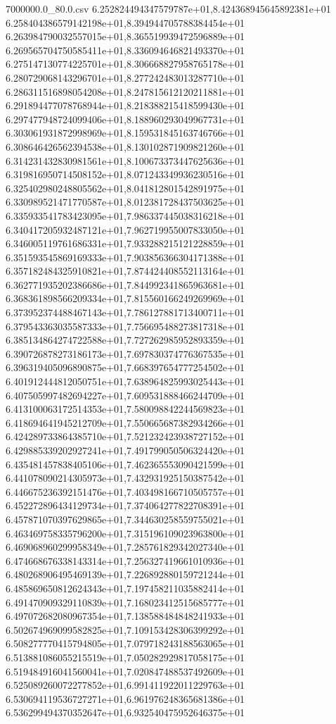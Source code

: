 \begin{filecontents*}{7000000.0_80.0.csv}
6.252824494347579787e+01,8.424368945645892381e+01
6.258404386579142198e+01,8.394944705788384454e+01
6.263984790032557015e+01,8.365519939472596889e+01
6.269565704750585411e+01,8.336094646821493370e+01
6.275147130774225701e+01,8.306668827958765178e+01
6.280729068143296701e+01,8.277242483013287710e+01
6.286311516898054208e+01,8.247815612120211881e+01
6.291894477078768944e+01,8.218388215418599430e+01
6.297477948724099406e+01,8.188960293049967731e+01
6.303061931872998969e+01,8.159531845163746766e+01
6.308646426562394538e+01,8.130102871909821260e+01
6.314231432830981561e+01,8.100673373447625636e+01
6.319816950714508152e+01,8.071243349936230516e+01
6.325402980248805562e+01,8.041812801542891975e+01
6.330989521471770587e+01,8.012381728437503625e+01
6.335933541783423095e+01,7.986337445038316218e+01
6.340417205932487121e+01,7.962719955007833050e+01
6.346005119761686331e+01,7.933288215121228859e+01
6.351593545869169333e+01,7.903856366304171388e+01
6.357182484325910821e+01,7.874424408552113164e+01
6.362771935202386686e+01,7.844992341865963681e+01
6.368361898566209334e+01,7.815560166249269969e+01
6.373952374488467143e+01,7.786127881713400711e+01
6.379543363035587333e+01,7.756695488273817318e+01
6.385134864274722588e+01,7.727262985952893359e+01
6.390726878273186173e+01,7.697830374776367535e+01
6.396319405096890875e+01,7.668397654777254502e+01
6.401912444812050751e+01,7.638964825993025443e+01
6.407505997482694227e+01,7.609531888466244709e+01
6.413100063172514353e+01,7.580098842244569823e+01
6.418694641945212709e+01,7.550665687382934266e+01
6.424289733864385710e+01,7.521232423938727152e+01
6.429885339202927241e+01,7.491799050506324420e+01
6.435481457838405106e+01,7.462365553090421599e+01
6.441078090214305973e+01,7.432931925150387542e+01
6.446675236392151476e+01,7.403498166710505757e+01
6.452272896434129734e+01,7.374064277822708391e+01
6.457871070397629865e+01,7.344630258559755021e+01
6.463469758335796200e+01,7.315196109023963800e+01
6.469068960299958349e+01,7.285761829342027340e+01
6.474668676338143314e+01,7.256327419661010936e+01
6.480268906495469139e+01,7.226892880159721244e+01
6.485869650812624343e+01,7.197458211035882414e+01
6.491470909329110839e+01,7.168023412515685777e+01
6.497072682080967354e+01,7.138588484848241933e+01
6.502674969099582825e+01,7.109153428306399292e+01
6.508277770415794805e+01,7.079718243188563065e+01
6.513881086055215519e+01,7.050282929817058175e+01
6.519484916041560041e+01,7.020847488537492609e+01
6.525089260072277852e+01,6.991411922011229763e+01
6.530694119536727271e+01,6.961976248365681386e+01
6.536299494370352647e+01,6.932540475952646375e+01

\end{filecontents*}
